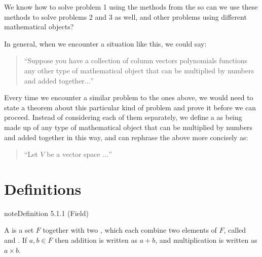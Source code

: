 \documentclass[letterpaper,10pt,english]{jupyterBook}
\begin{document}
\sphinxAtStartPar
We know how to solve problem 1 using the methods from the {\hyperref[\detokenize{_pages/2.0_Linear_systems:systems-of-linear-equations-chapter}]{}} \sphinxhyphen{} so can we use these methods to solve problems 2 and 3 as well, and other problems using different mathematical objects?

\sphinxAtStartPar
In general, when we encounter a situation like this, we could say:
\begin{quote}

\sphinxAtStartPar
“Suppose you have a collection of column vectors  polynomials  functions  any other type of mathematical object that can be multiplied by numbers and added together\(\ldots\)”
\end{quote}

\sphinxAtStartPar
Every time we encounter a similar problem to the ones above, we would need to state a theorem about this particular kind of problem and prove it before we can proceed. Instead of considering each of them separately, we define a  as being made up of any type of mathematical object that can be multiplied by numbers and added together in this way, and can rephrase the above more concisely as:
\begin{quote}

\sphinxAtStartPar
“Let \(V\) be a vector space \(\ldots\)”
\end{quote}

\sphinxstepscope


\section{Definitions}
\label{\detokenize{_pages/5.1_Vector_spaces_definitions:definitions}}\label{\detokenize{_pages/5.1_Vector_spaces_definitions:vector-spaces-definitions-section}}\label{\detokenize{_pages/5.1_Vector_spaces_definitions::doc}}\label{_pages/5.1_Vector_spaces_definitions:field-definition}
\begin{sphinxadmonition}{note}{Definition 5.1.1 (Field)}



\sphinxAtStartPar
A  is a set \(F\) together with two , which each combine two elements of \(F\), called  and . If \(a,b \in F\) then addition is written as \(a + b\), and multiplication is written as \(a \times b\).
\end{sphinxadmonition}
\end{document}
